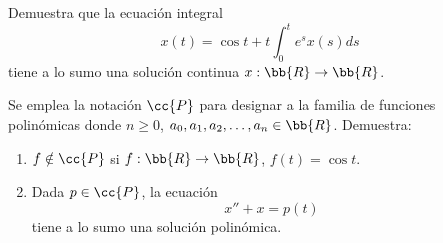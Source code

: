\documentclass[12pt]{article}
\begin{document}
    \begin{ejercicio}
        Demuestra que la ecuación integral
        \begin{equation*}
            x(t)=\cos t+t\int_0^t e^{s}x(s)ds
        \end{equation*}
        tiene a lo sumo una solución continua $x:\bb{R}\to\bb{R}$.
    \end{ejercicio}

    \begin{ejercicio}
        Se emplea la notación $\cc{P}$ para designar a la familia de funciones polinómicas
        donde $n\geq 0$, $a_0,a_1,a_2,\ldots,a_n\in\bb{R}$. Demuestra:
        \begin{enumerate}
            \item $f\notin \cc{P}$ si $f:\bb{R}\to\bb{R}$, $f(t)=\cos t$.
            \item Dada $p\in \cc{P}$, la ecuación
            \begin{equation*}
                x''+x=p(t)
            \end{equation*}
            tiene a lo sumo una solución polinómica.
        \end{enumerate}
    \end{ejercicio}
\end{document}
